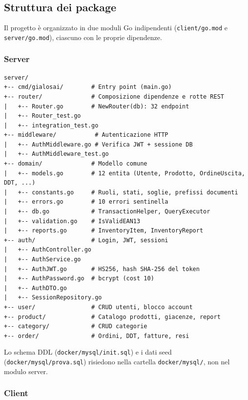 \documentclass[a4paper,12pt]{article}
\begin{document}
\subsection{Struttura dei package}

Il progetto è organizzato in due moduli Go indipendenti (\texttt{client/go.mod} e \texttt{server/go.mod}), ciascuno con le proprie dipendenze.

\subsubsection{Server}

\begin{verbatim}
server/
+-- cmd/gialosai/        # Entry point (main.go)
+-- router/              # Composizione dipendenze e rotte REST
|   +-- Router.go        # NewRouter(db): 32 endpoint
|   +-- Router_test.go
|   +-- integration_test.go
+-- middleware/           # Autenticazione HTTP
|   +-- AuthMiddleware.go # Verifica JWT + sessione DB
|   +-- AuthMiddleware_test.go
+-- domain/              # Modello comune
|   +-- models.go        # 12 entita (Utente, Prodotto, OrdineUscita, DDT, ...)
|   +-- constants.go     # Ruoli, stati, soglie, prefissi documenti
|   +-- errors.go        # 10 errori sentinella
|   +-- db.go            # TransactionHelper, QueryExecutor
|   +-- validation.go    # IsValidEAN13
|   +-- reports.go       # InventoryItem, InventoryReport
+-- auth/                # Login, JWT, sessioni
|   +-- AuthController.go
|   +-- AuthService.go
|   +-- AuthJWT.go       # HS256, hash SHA-256 del token
|   +-- AuthPassword.go  # bcrypt (cost 10)
|   +-- AuthDTO.go
|   +-- SessionRepository.go
+-- user/                # CRUD utenti, blocco account
+-- product/             # Catalogo prodotti, giacenze, report
+-- category/            # CRUD categorie
+-- order/               # Ordini, DDT, fatture, resi
\end{verbatim}

Lo schema DDL (\texttt{docker/mysql/init.sql}) e i dati seed (\texttt{docker/mysql/prova.sql}) risiedono nella cartella \texttt{docker/mysql/}, non nel modulo server.

\newpage
\subsubsection{Client}
\end{document}
